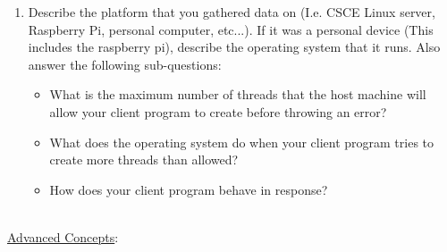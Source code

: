 \documentclass[12pt]{extarticle}
\begin{document}
\begin{itemize}
\begin{itemize}
\begin{enumerate}
\begin{itemize}
            \end{itemize}
            
            \item Describe the platform that you gathered data on (I.e. CSCE Linux server, Raspberry Pi, personal computer, etc...).  If it was a personal device (This includes the raspberry pi), describe the operating system that it runs.  Also answer the following sub-questions:
            \begin{itemize}
                \setlength\itemsep{-0.1em}
                
                \item What is the maximum number of threads that the host machine will allow your client program to create before throwing an error?
                \item What does the operating system do when your client program tries to create more threads than allowed?
                \item How does your client program behave in response?
                
            \end{itemize}
            
        \end{enumerate}
        
    \end{itemize}
    
\end{itemize}

\ \\
{\large \underline{Advanced Concepts}:}
\end{document}
